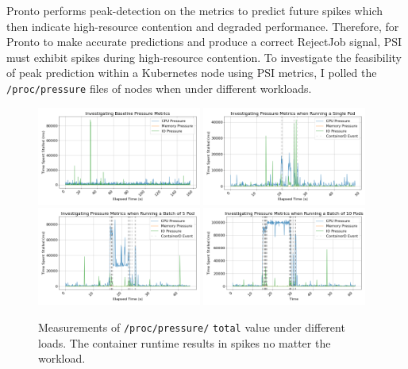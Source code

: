 Pronto performs peak-detection on the metrics to predict future spikes which
then indicate high-resource contention and degraded performance. Therefore, for
Pronto to make accurate predictions and produce a correct RejectJob signal, PSI
must exhibit spikes during high-resource contention. To investigate the
feasibility of peak prediction within a Kubernetes node using PSI metrics, I
polled the \verb|/proc/pressure| files of nodes when under different workloads.

\begin{figure}[H]
    \centering
    \includegraphics[width=0.48\textwidth]{images/pressure-baseline.png}
    \includegraphics[width=0.48\textwidth]{images/pressure-single.png} \\
    \includegraphics[width=0.48\textwidth]{images/pressure-smallbatch.png}
    \includegraphics[width=0.48\textwidth]{images/pressure-bigbatch.png}
    \caption{Measurements of \texttt{/proc/pressure/} \texttt{total} value under
    different loads. The container runtime results in spikes no matter the
    workload.}
    \label{fig:pressure}
\end{figure}

